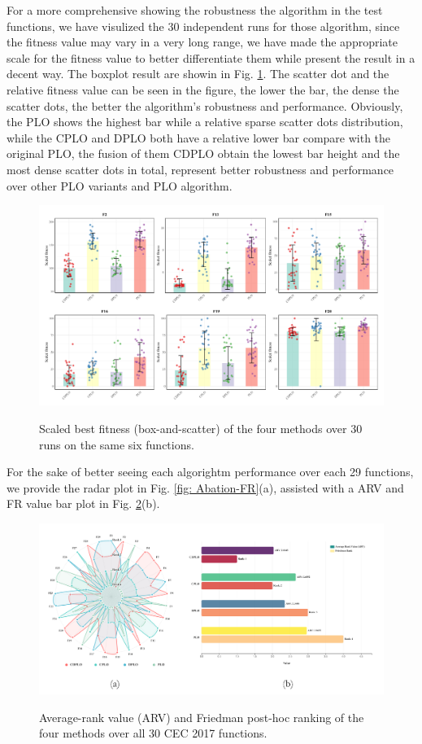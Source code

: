 \documentclass[review]{elsarticle}
\begin{document}
For a more comprehensive showing the robustness the algorithm in the test functions, we have visulized the 30 independent runs for those algorithm, since the fitness value may vary in a very long range, we have made the appropriate scale for the fitness value to better differentiate them while present the result in a decent way. The boxplot result are showin in Fig. \ref{fig: CDPLO-Ablation-boxplot}. The scatter dot and the relative fitness value can be seen in the figure, the lower the bar, the dense the scatter dots, the better the algorithm's robustness and performance. Obviously, the PLO shows the highest bar while a relative sparse scatter dots distribution, while the CPLO and DPLO both have a relative lower bar compare with the original PLO, the fusion of them CDPLO obtain the lowest bar height and the most dense scatter dots in total, represent better robustness and performance over other PLO variants and PLO algorithm.

 \begin{figure}
\centering
\caption{Scaled best fitness (box-and-scatter) of the four
           methods over 30 runs on the same six functions.}
\includegraphics[width=\linewidth]{CDPLO-Ablation-boxplot}
\label{fig: CDPLO-Ablation-boxplot}
\end{figure}

For the sake of better seeing each algorightm performance over each 29 functions, we provide the radar plot in Fig. \ref{fig: Abation-FR}(a), assisted with a ARV and FR value bar plot in Fig. \ref{fig: Ablation-FR}(b).

\begin{figure}
\centering
\caption{Average-rank value (ARV) and Friedman post-hoc ranking
           of the four methods over all 30 CEC 2017 functions.}
\includegraphics[width=\linewidth]{Ablation-FR}
\label{fig: Ablation-FR}
\end{figure}
\end{document}
